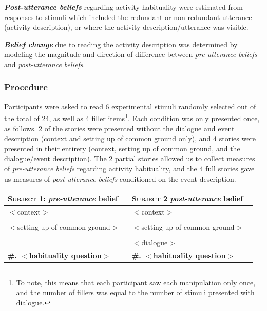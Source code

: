 \documentclass{sp}\usepackage[]{graphicx}\usepackage[]{color}
\begin{document}
\textbf{\textit{Post-utterance beliefs}} regarding activity habituality were estimated from responses to stimuli which included the redundant or non-redundant utterance (activity description), or where the activity description/utterance was visible.

\textbf{\textit{Belief change}} due to reading the activity description was determined by modeling the magnitude and direction of difference between \textit{pre-utterance beliefs} and \textit{post-utterance beliefs}.

\subsubsection{Procedure}

Participants were asked to read 6 experimental stimuli randomly selected out of the total of 24, as well as 4 filler items\footnote{To note, this means that each participant saw each manipulation only once, and the number of fillers was equal to the number of stimuli presented with dialogue.}.  Each condition was only presented once, as follows. 2 of the stories were presented without the dialogue and event description (context and setting up of common ground only), and 4 stories were presented in their entirety (context, setting up of common ground, and the dialogue/event description). The 2 partial stories allowed us to collect measures of \textit{pre-utterance beliefs} regarding activity habituality, and the 4 full stories gave us measures of \textit{post-utterance beliefs} conditioned on the event description. 

\begin{longtable}{|p{0.48\linewidth}|p{0.48\linewidth}|}
\hline
\textsc{Subject 1}: \textit{pre-utterance} belief & \textsc{Subject 2} \textit{post-utterance} belief\\
\hline
\hline
$<$context$>$ & $<$context$>$\\
&\\
$<$setting up of common ground$>$ & $<$setting up of common ground$>$\\
&\\
& $<$dialogue$>$\\
\hline
\textbf{\#. $<$habituality question$>$} & \textbf{\#. $<$habituality question$>$}\\
\hline
\end{longtable}

\normalsize
\addtocounter{table}{-1}
\end{document}

